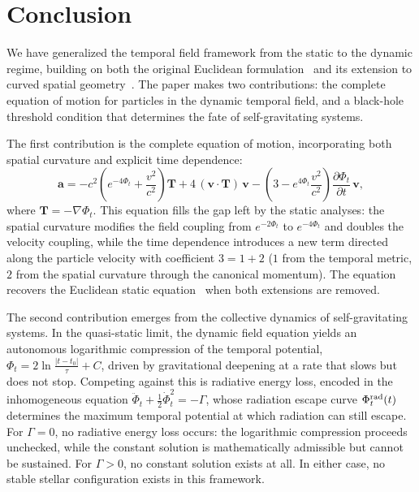 \documentclass[12pt]{article}
\begin{document}
\section{Conclusion}
\label{sec:conclusion}

We have generalized the temporal field framework from the static to the dynamic regime, building on both the original Euclidean formulation~\cite{Gwak2026a} and its extension to curved spatial geometry~\cite{Gwak2026b}. The paper makes two contributions: the complete equation of motion for particles in the dynamic temporal field, and a black-hole threshold condition that determines the fate of self-gravitating systems.

The first contribution is the complete equation of motion, incorporating both spatial curvature and explicit time dependence:
$$
\mathbf{a} = -c^2\!\left(e^{-4\Phi_t} + \frac{v^2}{c^2}\right)\mathbf{T}
+ 4\,(\mathbf{v}\cdot\mathbf{T})\,\mathbf{v}
- \left(3 - e^{4\Phi_t}\frac{v^2}{c^2}\right)\frac{\partial\Phi_t}{\partial t}\,\mathbf{v},
$$
where $\mathbf{T} = -\nabla\Phi_t$. This equation fills the gap left by the static analyses: the spatial curvature modifies the field coupling from $e^{-2\Phi_t}$ to $e^{-4\Phi_t}$ and doubles the velocity coupling, while the time dependence introduces a new term directed along the particle velocity with coefficient $3 = 1 + 2$ ($1$ from the temporal metric, $2$ from the spatial curvature through the canonical momentum). The equation recovers the Euclidean static equation~\cite{Gwak2026a} when both extensions are removed.

The second contribution emerges from the collective dynamics of self-gravitating systems. In the quasi-static limit, the dynamic field equation yields an autonomous logarithmic compression of the temporal potential, $\Phi_t = 2\ln\frac{|t - t_0|}{\tau} + C$, driven by gravitational deepening at a rate that slows but does not stop. Competing against this is radiative energy loss, encoded in the inhomogeneous equation $\ddot{\Phi}_t + \frac{1}{2}\dot{\Phi}_t^2 = -\Gamma$, whose radiation escape curve $\Phi_t^{\rm rad}(t)$ determines the maximum temporal potential at which radiation can still escape. For $\Gamma = 0$, no radiative energy loss occurs: the logarithmic compression proceeds unchecked, while the constant solution is mathematically admissible but cannot be sustained. For $\Gamma > 0$, no constant solution exists at all. In either case, no stable stellar configuration exists in this framework.
\end{document}
